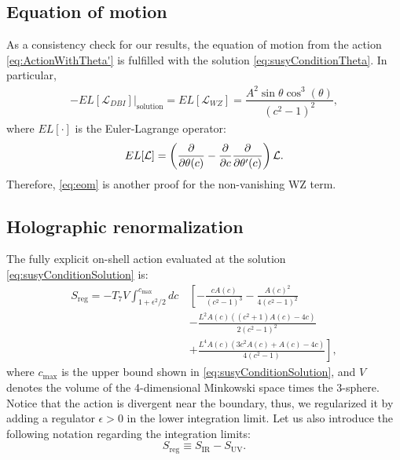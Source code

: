 
\subsection{Equation of motion}

As a consistency check for our results, the equation of motion from the action \eqref{eq:ActionWithTheta'} is fulfilled with the solution \eqref{eq:susyConditionTheta}. In particular, 
\begin{align}\label{eq:eom}
-\left.EL[\mathcal{L}_{DBI}]\right|_\text{solution} = EL[\mathcal{L}_{WZ}] = \dfrac{A^2 \sin\theta \cos^3(\theta)}{\left(c^2-1\right)^2},
\end{align}
where $EL[\cdot]$ is the Euler-Lagrange operator:
\begin{equation}
 EL[\mathcal{L}] = 
 \left(\dfrac{\partial }{\partial \theta(c)} -\dfrac{\partial }{\partial c}  \dfrac{\partial }{\partial \theta'(c)} \right) \mathcal{L}.
\end{equation}
Therefore, \eqref{eq:eom} is another proof for the non-vanishing WZ term.



\subsection{Holographic renormalization}
The fully explicit on-shell action evaluated at the solution \eqref{eq:susyConditionSolution} is:
\begin{align}\label{eq:ActionAtSolution}
 S_\text{reg} = -T_7 V \int_{1 + \epsilon^2/2}^{c_\text{max}} d c \, 
 &\left[-\frac{c A(c)}{\left(c^2-1\right)^3} -\frac{A(c)^2}{4 \left(c^2-1\right)^2} \right. \nonumber\\
 &-\frac{L^2 A(c) \left(\left(c^2+1\right) A(c)-4 c\right)}{2 \left(c^2-1\right)^2} \nonumber\\
 &+\left.\frac{L^4 A(c) \left(3 c^2 A(c)+A(c)-4 c\right)}{4 \left(c^2-1\right)}\right],
\end{align}
where $c_\text{max}$ is the upper bound shown in \eqref{eq:susyConditionSolution}, and $V$ denotes the volume of the 4-dimensional Minkowski space times the 3-sphere. Notice that the action is divergent near the boundary, thus, we regularized it by adding a regulator $\epsilon>0$ in the lower integration limit. Let us also introduce the following notation regarding the integration limits:
\begin{equation}
  S_\text{reg} \equiv S_\text{IR}-S_\text{UV}.
\end{equation}


